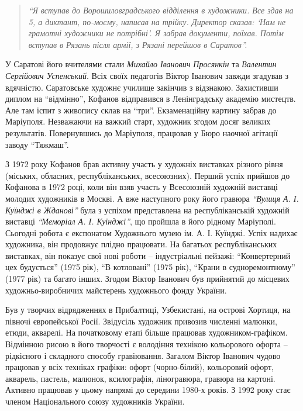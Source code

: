 \begin{quote}
\em\enquote{Я вступав до Ворошиловградського
відділення в художники. Все здав на 5, а диктант, по-моєму, написав на трійку.
Директор сказав: \enquote{Нам не грамотні художники не потрібні}. Я забрав документи,
поїхав. Потім вступав в Рязань після армії, з Рязані перейшов в Саратов}.
\end{quote}


У Саратові його вчителями стали \emph{Михайло Іванович Просянкін} та \emph{Валентин
Сергійович Успенський}. Всіх своїх педагогів Віктор Іванович завжди згадував з
вдячністю. Саратовське художнє училище закінчив з відзнакою. Захистивши диплом
на \enquote{відмінно}, Кофанов відправився в Ленінградську академію мистецтв. Але там
іспит з живопису склав на \enquote{три}. Екзаменаційну картину забрав до Маріуполя.
Незважаючи на важкий старт, художник згодом досяг великих результатів.
Повернувшись до Маріуполя, працював у Бюро наочної агітації заводу \enquote{Тяжмаш}.


З 1972 року Кофанов брав активну участь у художніх виставках різного рівня
(міських, обласних, республіканських, всесоюзних). Перший успіх прийшов до
Кофанова в 1972 році, коли він взяв участь у Всесоюзній художній виставці
молодих художників в Москві. А вже наступного року його гравюра \emph{\enquote{Вулиця А. І.
Куїнджі в Жданові}} була з успіхом представлена на республіканській художній
виставці \emph{\enquote{Меморіал А. І. Куїнджі}}, що пройшла в його рідному Маріуполі. Сьогодні
робота  є експонатом Художнього музею ім. А. І. Куїнджі. Успіх надихає
художника, він продовжує плідно працювати. На багатьох республіканських
виставках, він показує свої нові роботи – індустріальні пейзажі: \enquote{Конвертерний
цех будується} (1975 рік), \enquote{В котловані} (1975 рік), \enquote{Крани в судноремонтному}
(1977 рік) та багато інших. Згодом Віктор Іванович був прийнятий до місцевих
художньо-виробничих майстерень художнього фонду України.

Був у творчих відрядженнях в Прибалтиці, Узбекистані, на острові Хортиця, на
півночі європейської Росії. Звідусіль художник привозив численні малюнки,
етюди, акварелі. На початковому етапі більше працював художником-графіком.
Відмінною рисою в його творчості є володіння технікою кольорового офорта –
рідкісного і складного способу гравіювання. Загалом Віктор Іванович чудово
працював у всіх техніках графіки: офорт (чорно-білий), кольоровий офорт,
акварель, пастель,  малюнок, ксилографія, ліногравюра, гравюра на картоні.
Активно працював у цьому напрямі до середини 1980-х років. З 1992 року стає
членом Національного союзу художників України.

